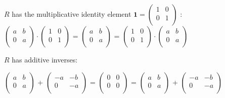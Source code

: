 $R$ has the multiplicative identity element $\mathbf{1} = \left(%
    \begin{array}{cc}
      1 & 0 \\
      0 & 1 \\
    \end{array}%
    \right)$ : \\
    $\left(%
\begin{array}{cc}
  a & b \\
  0 & a \\
\end{array}%
\right) \cdot 
    \left(%
    \begin{array}{cc}
      1 & 0 \\
      0 & 1 \\
    \end{array}%
    \right)$ = 
    $\left(%
    \begin{array}{cc}
      a & b \\
      0 & a \\
    \end{array}%
    \right)$ =
    $\left(%
    \begin{array}{cc}
      1 & 0 \\
      0 & 1 \\
    \end{array}%
    \right) \cdot
\left(%
\begin{array}{cc}
  a & b \\
  0 & a \\
\end{array}%
\right)$

$R$ has additive inverses:

$\left(%
\begin{array}{cc}
  a & b \\
  0 & a \\
\end{array}%
\right)$ + 
    $\left(%
    \begin{array}{cc}
      -a & -b \\
      0 & -a \\
    \end{array}%
    \right)$ = 
    $\left(%
    \begin{array}{cc}
      0 & 0 \\
      0 & 0 \\
    \end{array}%
    \right)$ =
    $\left(%
    \begin{array}{cc}
      a & b \\
      0 & a \\
    \end{array}%
    \right)$ + 
$\left(%
\begin{array}{cc}
  -a & -b \\
  0 & -a \\
\end{array}%
\right)$

